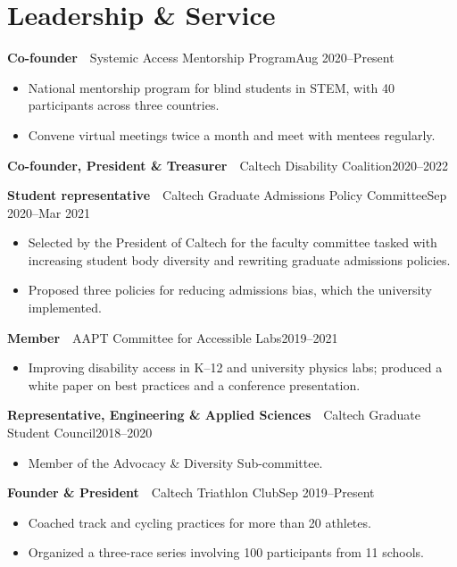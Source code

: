 \documentclass[11pt,letterpaper]{article}
\newcommand{\entry}[3]{\noindent\textbf{#1}~\textbar~#2\hfill{#3}\par}
\newcommand{\simpleentry}[2]{\noindent #1\hfill{#2}\par\vspace{1pt}}
\let\oldsection\section
\renewcommand{\section}[1]{\Needspace*{5\baselineskip}\oldsection{#1}}
\begin{document}
\section{Leadership \& Service}

\entry{Co-founder}{Systemic Access Mentorship Program}{Aug 2020--Present}
\begin{itemize}
  \item National mentorship program for blind students in STEM, with 40 participants across three countries.
  \item Convene virtual meetings twice a month and meet with mentees regularly.
\end{itemize}
\vspace{3pt}

\simpleentry{\textbf{Co-founder, President \& Treasurer}~\textbar~Caltech Disability Coalition}{2020--2022}
\vspace{3pt}

\entry{Student representative}{Caltech Graduate Admissions Policy Committee}{Sep 2020--Mar 2021}
\begin{itemize}
  \item Selected by the President of Caltech for the faculty committee tasked with increasing student body diversity and rewriting graduate admissions policies.
  \item Proposed three policies for reducing admissions bias, which the university implemented.
\end{itemize}
\vspace{3pt}

\entry{Member}{AAPT Committee for Accessible Labs}{2019--2021}
\begin{itemize}
  \item Improving disability access in K--12 and university physics labs; produced a white paper on best practices and a conference presentation.
\end{itemize}
\vspace{3pt}

\entry{Representative, Engineering \& Applied Sciences}{Caltech Graduate Student Council}{2018--2020}
\begin{itemize}
  \item Member of the Advocacy \& Diversity Sub-committee.
\end{itemize}
\vspace{3pt}

\entry{Founder \& President}{Caltech Triathlon Club}{Sep 2019--Present}
\begin{itemize}
  \item Coached track and cycling practices for more than 20 athletes.
  \item Organized a three-race series involving 100 participants from 11 schools.
\end{itemize}
\vspace{3pt}
\end{document}
